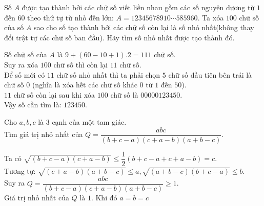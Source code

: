 \begin{ex}%
Số $A$ được tạo thành bởi các chữ số viết liền nhau gồm các số nguyên dương từ $1$ đến $60$ theo thứ tự từ nhỏ đến lớn: $A=12345678910 \cdots 585960$. Ta xóa $100$ chữ số của số $A$ sao cho số tạo thành bởi các chữ số còn lại là số nhỏ nhất(không thay đổi trật tự các chữ số ban đầu). Hãy tìm số nhỏ nhất được tạo thành đó.
\loigiai
    {Số chữ số của $A$ là $9 +(60-10+1).2 = 111$ chữ số.\\
Suy ra  xóa $100$ chữ số thì còn lại $11$ chữ số.\\
Để số mới có $11$ chữ số nhỏ nhất thì ta phải chọn $5$ chữ số đầu tiên bên trái là chữ số $0$ (nghĩa là xóa hết các chữ số khác $0$ từ $1$ đến $50$).\\
$11$ chữ số còn lại sau khi xóa $100$ chữ số là $00000123450$.\\
Vậy số cần tìm là: $123450$.

    }
\end{ex}

\begin{ex}%
Cho $a,b,c$ là 3 cạnh của một tam giác.\\
Tìm giá trị nhỏ nhất của $Q=\dfrac{abc}{(b+c-a)(c+a-b)(a+b-c)}$.
\loigiai
    {Ta có $\sqrt{(b+c-a)(c+a-b)}\le \dfrac{1}{2}(b+c-a+c+a-b)=c$.\\
 Tương tự: $\sqrt{(c+a-b)(a+b-c)}\le a, \sqrt{(a+b-c)(b+c-a)}\le b$.\\
Suy ra $Q=\dfrac{abc}{(b+c-a)(c+a-b)(a+b-c)}\ge 1$.\\
Giá trị nhỏ nhất của $Q$ là $1$. Khi đó $a=b=c$ 

    }
\end{ex}

